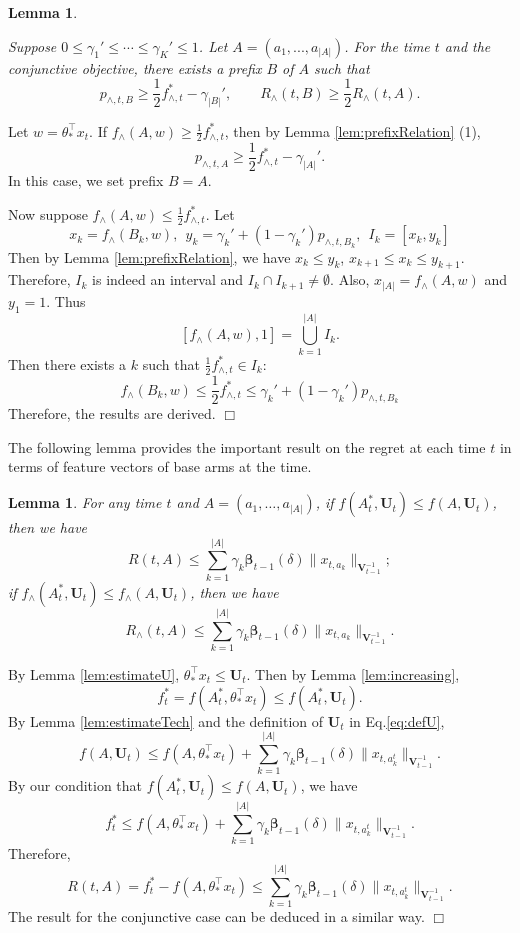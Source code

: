 \documentclass{article}
\newcommand{\bbeta}{\boldsymbol{\beta}}
\newcommand{\bU}{\mathbf{U}}
\newcommand{\bV}{\mathbf{V}}
\newcommand{\abs}[1]{\left| #1 \right|}
\newcommand{\norm}[1]{\| #1 \|}
\newtheorem{lemma}[theorem]{Lemma}%
\newenvironment{proof}{\noindent {\textbf{Proof. }}}{$\Box$ \medskip}
\newcommand{\CLemmaPrefixExi}{
  Suppose $0 \leq \gamma_1' \leq \cdots \leq \gamma_K' \leq 1$. Let $A = (a_1, ..., a_{\abs{A}})$. For the time $t$ and the conjunctive objective, there exists a prefix $B$ of $A$ such that 
  $$
    p_{\wedge, t, B} \geq \frac{1}{2}f_{\wedge, t}^{\ast} - \gamma_{\abs{B}}', \qquad R_{\wedge}(t, B) \geq \frac{1}{2} R_{\wedge}(t, A).
  $$ 
}
\begin{document}
\begin{lemma} %
  \label{lem:prefixexists}
  \CLemmaPrefixExi
\end{lemma}
\begin{proof}
  Let $w= \theta_*^{\top} x_t$.
  If $f_{\wedge}(A, w) \geq \frac{1}{2} f_{\wedge, t}^{\ast}$, then by Lemma \ref{lem:prefixRelation} (1),
  $$
    p_{\wedge, t, A} \geq \frac{1}{2}f_{\wedge, t}^{\ast} - \gamma_{\abs{A}}'.
  $$
  In this case, we set prefix $B = A$.
	
  Now suppose $f_{\wedge}(A, w) \leq \frac{1}{2} f_{\wedge, t}^{\ast}$. Let
  $$
    x_k = f_{\wedge}(B_k,w), ~~ y_k = \gamma_k' + (1 - \gamma_k')p_{\wedge, t,B_k}, ~~I_k = [x_k, y_k]
  $$
  Then by Lemma \ref{lem:prefixRelation}, we have $x_k \leq y_k$, $x_{k+1} \leq x_k \leq y_{k+1}$. Therefore, $I_k$ is indeed an interval and $I_k \cap I_{k+1} \neq \emptyset$. Also, $x_{\abs{A}} = f_{\wedge}(A, w)$ and $y_1 = 1$. Thus
  $$
    [f_{\wedge}(A,w), 1] = \bigcup_{k=1}^{\abs{A}} I_k.
  $$
  Then there exists a $k$ such that $\frac{1}{2}f_{\wedge, t}^{\ast} \in I_k$:
  $$
    f_{\wedge}(B_k,w) \leq \frac{1}{2}f_{\wedge, t}^{\ast} \leq \gamma_k' + (1 - \gamma_k')p_{\wedge, t, B_k}
  $$
  Therefore, the results are derived.
\end{proof}

The following lemma provides the important result on the regret at each time $t$ in terms of feature vectors of base arms at the time.
\begin{lemma} %
  \label{lem:DeltaEstimate}
  For any time $t$ and $A = (a_1, \ldots, a_{\abs{A}})$, if $f(A_t^*, \bU_t) \leq f(A, \bU_t)$, then we have
  $$
    R(t,A) \leq \sum_{k=1}^{\abs{A}} \gamma_k \bbeta_{t-1}(\delta)\norm{x_{t,a_k}}_{\bV_{t-1}^{-1}};
  $$
  if $f_{\wedge}(A_t^*, \bU_t) \leq f_{\wedge}(A, \bU_t)$, then we have
  $$
    R_{\wedge}(t, A) \leq \sum_{k=1}^{\abs{A}} \gamma_k \bbeta_{t-1}(\delta)\norm{x_{t,a_k}}_{\bV_{t-1}^{-1}}.
  $$
\end{lemma}
\begin{proof}
  By Lemma \ref{lem:estimateU}, $\theta_{\ast}^{\top}x_t \leq \bU_t$. Then by Lemma \ref{lem:increasing},
  $$
    f_t^{\ast} = f(A_t^{\ast}, \theta_{\ast}^{\top}x_t) \leq f(A_t^{\ast}, \bU_t).
  $$
  By Lemma \ref{lem:estimateTech} and the definition of $\bU_t$ in Eq.\eqref{eq:defU},
  $$
    f(A, \bU_t) \leq f(A, \theta_{\ast}^{\top}x_t) + \sum_{k=1}^{\abs{A}} \gamma_k \bbeta_{t-1}(\delta)\norm{x_{t, a_k^t}}_{\bV_{t-1}^{-1}}.
  $$
  By our condition that $f(A_t^{\ast}, \bU_t) \leq f(A, \bU_t)$, we have 
  $$
    f_t^{\ast} \leq f(A, \theta_{\ast}^{\top}x_t) + \sum_{k=1}^{\abs{A}} \gamma_k \bbeta_{t-1}(\delta)\norm{x_{t, a_k^t}}_{\bV_{t-1}^{-1}}.
  $$
  Therefore,
  $$
    R(t, A) = f_t^{\ast} - f(A, \theta_{\ast}^{\top}x_t) \leq \sum_{k=1}^{\abs{A}} \gamma_k \bbeta_{t-1}(\delta)\norm{x_{t, a_k^t}}_{\bV_{t-1}^{-1}}.
  $$
  The result for the conjunctive case can be deduced in a similar way.
\end{proof}
\end{document}
